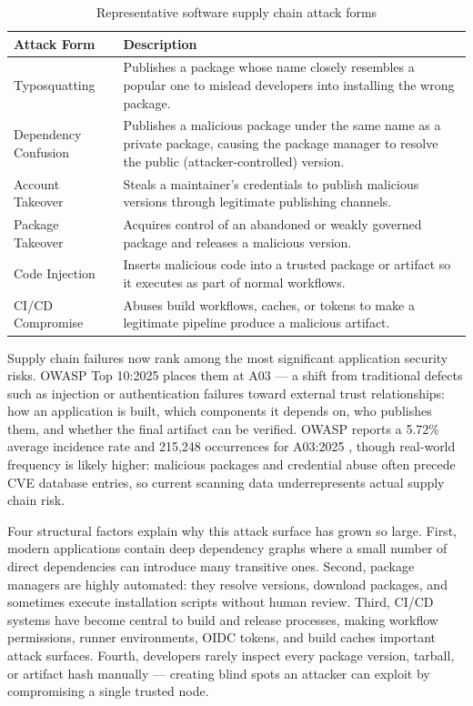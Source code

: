 \documentclass[12pt,a4paper]{article}
\begin{document}
\begin{table}[h]
\centering
\caption{Representative software supply chain attack forms}
\renewcommand{\arraystretch}{1.4}
\begin{tabularx}{\textwidth}{P{5cm}Y}
\toprule
\textbf{Attack Form} & \textbf{Description} \\
\midrule
Typosquatting & Publishes a package whose name closely resembles a popular one to mislead developers into installing the wrong package. \\
\addlinespace
Dependency Confusion & Publishes a malicious package under the same name as a private package, causing the package manager to resolve the public (attacker-controlled) version. \\
\addlinespace
Account Takeover & Steals a maintainer's credentials to publish malicious versions through legitimate publishing channels. \\
\addlinespace
Package Takeover & Acquires control of an abandoned or weakly governed package and releases a malicious version. \\
\addlinespace
Code Injection & Inserts malicious code into a trusted package or artifact so it executes as part of normal workflows. \\
\addlinespace
CI/CD Compromise & Abuses build workflows, caches, or tokens to make a legitimate pipeline produce a malicious artifact. \\
\bottomrule
\end{tabularx}
\renewcommand{\arraystretch}{1}
\end{table}

Supply chain failures now rank among the most significant application security risks. OWASP Top 10:2025 places them at A03 \cite{owasp-top10-a03} --- a shift from traditional defects such as injection or authentication failures toward external trust relationships: how an application is built, which components it depends on, who publishes them, and whether the final artifact can be verified. OWASP reports a 5.72\% average incidence rate and 215,248 occurrences for A03:2025 \cite{owasp-top10-a03,owasp-methodology}, though real-world frequency is likely higher: malicious packages and credential abuse often precede CVE database entries, so current scanning data underrepresents actual supply chain risk.

Four structural factors explain why this attack surface has grown so large. First, modern applications contain deep dependency graphs where a small number of direct dependencies can introduce many transitive ones. Second, package managers are highly automated: they resolve versions, download packages, and sometimes execute installation scripts without human review. Third, CI/CD systems have become central to build and release processes, making workflow permissions, runner environments, OIDC tokens, and build caches important attack surfaces. Fourth, developers rarely inspect every package version, tarball, or artifact hash manually --- creating blind spots an attacker can exploit by compromising a single trusted node.
\end{document}
